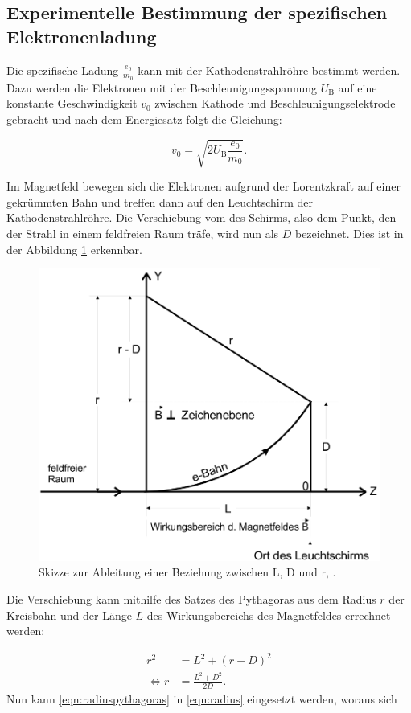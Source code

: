 \subsection{Experimentelle Bestimmung der spezifischen Elektronenladung}
Die spezifische Ladung $\frac{e_0}{m_0}$ kann mit der Kathodenstrahlröhre bestimmt werden. Dazu werden die Elektronen mit der Beschleunigungsspannung $U_{\text{B}}$ auf eine konstante Geschwindigkeit $v_0$ zwischen Kathode und Beschleunigungselektrode gebracht und nach dem Energiesatz folgt die Gleichung:

\begin{equation}
v_0 = \sqrt{2U_{\text{B}} \frac{e_0}{m_0}}.
\label{eqn:geschwindigkeitspannung}
\end{equation}

Im Magnetfeld bewegen sich die Elektronen aufgrund der Lorentzkraft auf einer gekrümmten Bahn und treffen dann auf den Leuchtschirm der Kathodenstrahlröhre. Die Verschiebung vom des Schirms, also dem Punkt, den der Strahl in einem feldfreien Raum träfe, wird nun als $D$ bezeichnet. Dies ist in der Abbildung \ref{fig:bahnkurve} erkennbar.

\begin{figure}[h!]
	\centering
	\includegraphics[width=0.7\linewidth]{../../bahnkurve}
	\caption{Skizze zur Ableitung einer Beziehung zwischen L, D und r, \cite[2]{anleitung502}.}
	\label{fig:bahnkurve}
\end{figure}

Die Verschiebung kann mithilfe des Satzes des Pythagoras aus dem Radius $r$ der Kreisbahn und der Länge $L$ des Wirkungsbereichs des Magnetfeldes errechnet werden:

\begin{equation}
\begin{aligned}
r^2 &= L^2 + (r-D)^2 \\
\iff r &= \frac{L^2 + D^2}{2D}.
\label{eqn:radiuspythagoras}
\end{aligned}
\end{equation}
Nun kann \ref{eqn:radiuspythagoras} in \ref{eqn:radius} eingesetzt werden, woraus sich

